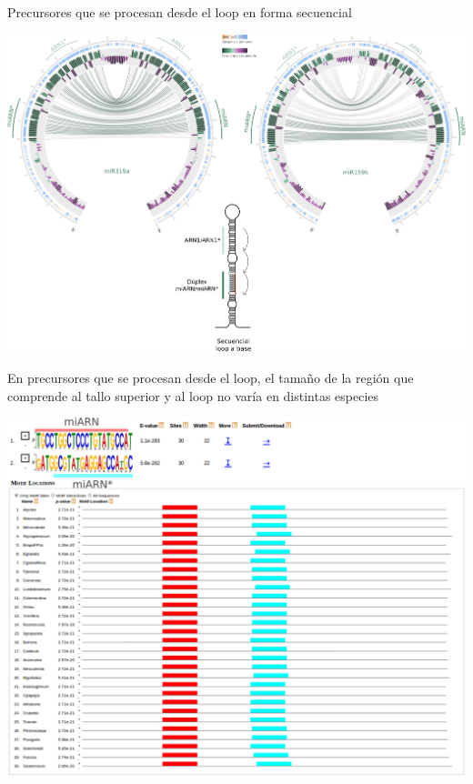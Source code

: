 \documentclass{beamer}
\begin{document}
\begin{frame}{Precursores que se procesan desde el loop en forma secuencial}
	\begin{center}
		\includegraphics[width=1\textwidth]{img/seqLTB_circos.png}
	\end{center}
\end{frame}

\begin{frame}{En precursores que se procesan desde el loop, el tamaño de la región que comprende al tallo superior y al loop no varía en distintas especies}

	\begin{center}
		\includegraphics[width=.8\textwidth]{img/miR160a_meme.png}
	\end{center}
\end{frame}
\end{document}
